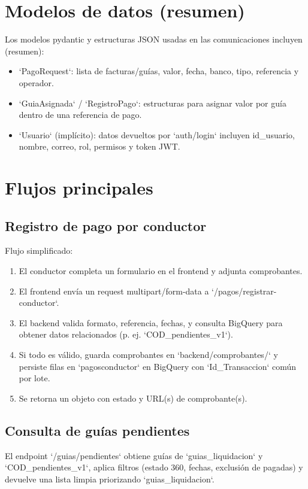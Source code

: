 \section{Modelos de datos (resumen)}
Los modelos pydantic y estructuras JSON usadas en las comunicaciones incluyen (resumen):
\begin{itemize}
\item `PagoRequest`: lista de facturas/guías, valor, fecha, banco, tipo, referencia y operador.
\item `GuiaAsignada` / `RegistroPago`: estructuras para asignar valor por guía dentro de una referencia de pago.
\item `Usuario` (implícito): datos devueltos por `auth/login` incluyen id_usuario, nombre, correo, rol, permisos y token JWT.
\end{itemize}

\section{Flujos principales}
\subsection{Registro de pago por conductor}
Flujo simplificado:
\begin{enumerate}
\item El conductor completa un formulario en el frontend y adjunta comprobantes.
\item El frontend envía un request multipart/form-data a `/pagos/registrar-conductor`.
\item El backend valida formato, referencia, fechas, y consulta BigQuery para obtener datos relacionados (p. ej. `COD_pendientes_v1`).
\item Si todo es válido, guarda comprobantes en `backend/comprobantes/` y persiste filas en `pagosconductor` en BigQuery con `Id_Transaccion` común por lote.
\item Se retorna un objeto con estado y URL(s) de comprobante(s).
\end{enumerate}

\subsection{Consulta de guías pendientes}
El endpoint `/guias/pendientes` obtiene guías de `guias_liquidacion` y `COD_pendientes_v1`, aplica filtros (estado 360, fechas, exclusión de pagadas) y devuelve una lista limpia priorizando `guias_liquidacion`.

